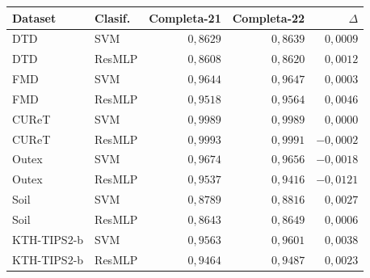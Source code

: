 \begin{resulttable}
\centering\fontsize{8}{10}\selectfont\setlength{\tabcolsep}{3.0pt}
\caption{Efecto pareado de añadir BEiTv2-B a la concatenación completa: macro-F1 con 21 y 22 bloques sobre las mismas condiciones externas.}
\label{tab:beitv2-effect}
\begin{tabular}{@{}llrrr@{}}
\toprule
Dataset & Clasif. & Completa-21 & Completa-22 & $\Delta$ \\
\midrule
DTD & SVM & $0{,}8629$ & $0{,}8639$ & $0{,}0009$ \\
DTD & ResMLP & $0{,}8608$ & $0{,}8620$ & $0{,}0012$ \\
FMD & SVM & $0{,}9644$ & $0{,}9647$ & $0{,}0003$ \\
FMD & ResMLP & $0{,}9518$ & $0{,}9564$ & $0{,}0046$ \\
CUReT & SVM & $0{,}9989$ & $0{,}9989$ & $0{,}0000$ \\
CUReT & ResMLP & $0{,}9993$ & $0{,}9991$ & $-0{,}0002$ \\
Outex & SVM & $0{,}9674$ & $0{,}9656$ & $-0{,}0018$ \\
Outex & ResMLP & $0{,}9537$ & $0{,}9416$ & $-0{,}0121$ \\
Soil & SVM & $0{,}8789$ & $0{,}8816$ & $0{,}0027$ \\
Soil & ResMLP & $0{,}8643$ & $0{,}8649$ & $0{,}0006$ \\
KTH-TIPS2-b & SVM & $0{,}9563$ & $0{,}9601$ & $0{,}0038$ \\
KTH-TIPS2-b & ResMLP & $0{,}9464$ & $0{,}9487$ & $0{,}0023$ \\
\bottomrule
\end{tabular}
\par{}
\end{resulttable}
\FloatBarrier
